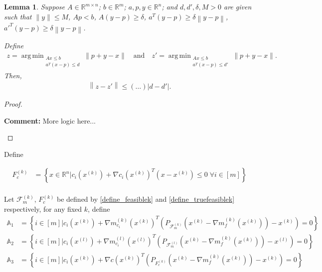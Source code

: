 \documentclass{article}
\newenvironment{comment}
  {\par\medskip
   \color{red}%
   \begin{framed}
   \textbf{Comment: }\ignorespaces}
 {\end{framed}
  \medskip}
\newtheorem{lemma}[theorem]{Lemma}
\theoremstyle{case}
\numberwithin{theorem}{subsection}
\DeclareMathOperator*{\argmin}{arg\,min}
\newcommand{\feasiblek}{{\mathcal F_m^{(k)}}}
\newcommand{\feasiblel}{{\mathcal F_m^{(l)}}}
\newcommand{\gk}{{\nabla m_f^{(k)}\left(\xk\right)}}
\newcommand{\gmcik}{{\nabla m_{c_i}^{(k)}\left(\xk\right)}}
\newcommand{\gmcil}{{\nabla m_{c_i}^{(l)}\left(\xl\right)}}
\newcommand{\reals}{\mathbb R}
\newcommand{\Rm}{\mathbb R^m}
\newcommand{\Rn}{\mathbb R^n}
\newcommand{\xk}{x^{(k)}}
\newcommand{\xl}{{x^{(l)}}}
\newcommand{\truefeasiblek}{{F_c^{(k)}}}
\begin{document}
\begin{lemma}
Suppose
$A \in \reals^{m \times n}$;
$b \in \Rm$;
$a, p, y \in \Rn$;
and $d, d', \delta, M > 0$
are given such that
$\|y\| \le M$, $Ap < b$, $A (y - p) \ge \delta$, $a^T(y - p) \ge \delta \left\|y - p\right\|$, ${a'}^T(y - p) \ge \delta \left\|y - p\right\|$.

Define
\begin{align*}
z  = \argmin_{\substack{Ax \le b \\ a^T \left(x - p\right) \le d}} \|p + y - x\|
\quad \textrm{and} \quad
z' = \argmin_{\substack{Ax \le b \\ {a}^T \left(x - p\right) \le d'}} \|p + y - x\|.
\end{align*}
Then, 
\begin{align*}
\left\|z - z'\right\| \le \left(\ldots\right) |d - d'|.
\end{align*}
\end{lemma}
\begin{proof}
\begin{comment}
More logic here...
\end{comment}
\end{proof}






Define

\begin{align}
\truefeasiblek &= \left\{ x \in \Rn \bigg| c_i\left(\xk\right) + \nabla c_i\left(\xk\right)^T \left(x - \xk\right) \le 0 \; \forall i \in [m] \right\} \label{define_truefeasiblek} \\
\end{align}


Let $\feasiblek$, $\truefeasiblek$ be defined by \cref{define_feasiblek} and \cref{define_truefeasiblek} respectively, for any fixed $k$, define
\begin{align}
\mathbb A_1 &= \left\{ i \in [m] \bigg | c_i\left(\xk\right) + \gmcik^T\left( P_{\feasiblek}\left(\xk - \gk\right) - \xk\right) = 0\right\} \label{tbbt_a1} \\
\mathbb A_2 &= \left\{ i \in [m] \bigg | c_i\left(\xl\right) + \gmcil^T\left( P_{\feasiblel}\left(\xk - \gk\right) - \xl\right) = 0\right\} \label{tbbt_a2}\\
\mathbb A_3 &= \left\{ i \in [m] \bigg | c_i\left(\xk\right) + \nabla c\left(\xk\right)^T\left( P_{\truefeasiblek}\left(\xk - \gk\right) - \xk\right) = 0\right\} \label{tbbt_a3}
\end{align}
\end{document}
